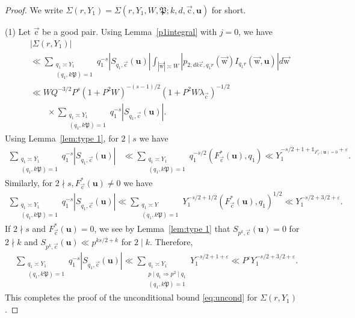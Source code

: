 \documentclass[letterpaper,11pt]{amsart}
\numberwithin{equation}{section}
\theoremstyle{definition}
\numberwithin{equation}{section}
\newcommand{\uu}{\mathbf{u}}
\newcommand{\uw}{{\vec{\mathrm{w}}}}
\newcommand{\uc}{{\vec{\mathrm{c}}}}
\newcommand{\ve}{\varepsilon}
\begin{document}
\begin{proof} We write $\Sigma(r, Y_1)=\Sigma(r, Y_1, W, \mathfrak P;k,d, \uc, \uu)$ for short.

(1) Let $\uc$ be a good pair.
 Using Lemma~\ref{p1integral} with $j=0$, we have 
\begin{align}
\nonumber
 &|\Sigma(r,Y_1)|
 \\
 \nonumber
& \ll \sum_{\substack{q_1\asymp Y_1\\ (q_1, k\mathfrak P)=1}}q_1^{-s} |S_{q_1, \uc}(\uu)| \int_{|\uw| \asymp W}|p_{2, dk\uc, q_1r}(\uw)I_{q_1r}(\uw, \uu)|d\uw\\\nonumber
&\ll  WQ^{-3/2} P^{s}(1+P^2W)^{-(s-1)/2}(1+P^2W\lambda_\uc)^{-1/2}
\\&\qquad \times \sum_{\substack{q_1\asymp Y_1\\ (q_1, k\mathfrak P)=1}}q_1^{-s} |S_{q_1, \uc}(\uu)|.
\label{sigma1ry}
\end{align}
Using Lemma~\ref{lem:type 1}, for $2\mid s$ we have
\begin{align*}
\sum_{\substack{q_1\asymp Y_1\\ (q_1, k\mathfrak P)=1}}q_1^{-s} |S_{q_1, \uc}(\uu)|
&\ll \sum_{\substack{q_1\asymp Y_1\\ (q_1, k\mathfrak P)=1}} q_1^{-s/2}(F_\uc^*(\uu), q_1)\ll Y_1^{-s/2+1+\mathds 1_{F_\uc^*(\uu)=0}+\ve}.
\end{align*}
Similarly, for $2\nmid s, F_\uc^*(\uu)\not=0$ we have
\begin{align*}
\sum_{\substack{q_1\asymp Y_1\\ (q_1, k\mathfrak P)=1}}q_1^{-s} |S_{q_1, \uc}(\uu)|\ll  \sum_{\substack{q_1\asymp Y\\ (q_1, k\mathfrak P)=1}}Y_1^{-s/2+1/2}(F_\uc^*(\uu), q_1)^{1/2}\ll Y_1^{-s/2+3/2+\ve}.
\end{align*}
If $2\nmid s$ and $F_\uc^*(\uu)=0$, we see by Lemma~\ref{lem:type 1} that 
$S_{p^k, \uc}(\uu)=0$ for $2\nmid k$  and 
$S_{p^k, \uc}(\uu)\ll p^{ks/2+k}$ for $2\mid k$. Therefore,
\begin{align*}
\sum_{\substack{q_1\asymp Y_1\\ (q_1, k\mathfrak P)=1}}q_1^{-s} |S_{q_1, \uc}(\uu)|\ll   \sum_{\substack{q_1\asymp Y_1\\ p\mid q_1\Rightarrow p^2\mid q_1 \\(q_1, k\mathfrak P)=1}}Y_1^{-s/2+1+\ve}\ll P^{\ve} Y_1^{-s/2+3/2+\ve}.
\end{align*}
This completes the proof of the unconditional bound \eqref{eq:uncond} for $\Sigma(r, Y_1)$.
 

\end{proof}
\end{document}
